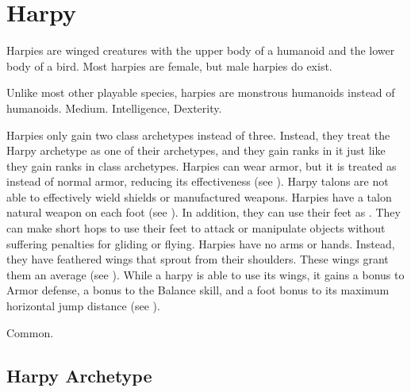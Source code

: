 \section{Harpy}
  Harpies are winged creatures with the upper body of a humanoid and the lower body of a bird.
  Most harpies are female, but male harpies do exist.

   Unlike most other playable species, harpies are monstrous humanoids instead of humanoids.
   Medium.
    Intelligence,  Dexterity.
  \begin{raggeditemize}
     Harpies only gain two class archetypes instead of three.
      Instead, they treat the Harpy archetype as one of their archetypes, and they gain ranks in it just like they gain ranks in class archetypes.
     Harpies can wear armor, but it is treated as  instead of normal armor, reducing its effectiveness (see ).
      Harpy talons are not able to effectively wield shields or manufactured weapons.
     Harpies have a talon natural weapon on each foot (see ).
      In addition, they can use their feet as .
      They can make short hops to use their feet to attack or manipulate objects without suffering penalties for gliding or flying.
     Harpies have no arms or hands.
      Instead, they have feathered wings that sprout from their shoulders.
      These wings grant them an average  (see ).
     While a harpy is able to use its wings, it gains a  bonus to Armor defense, a  bonus to the Balance skill, and a  foot bonus to its maximum horizontal jump distance (see ).
  \end{raggeditemize}
   Common.

  \subsection{Harpy Archetype}

